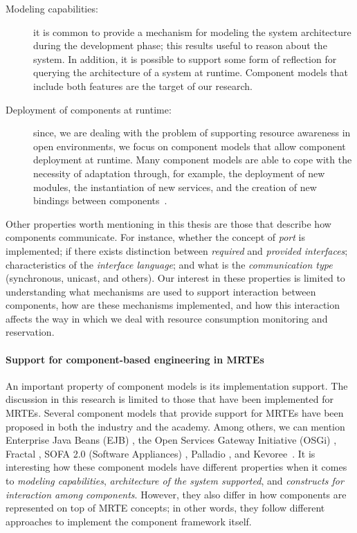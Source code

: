 \begin{description}
\item[Modeling capabilities:] it is common to provide a mechanism for modeling the system architecture during the development phase; this results useful to reason about the system.
In addition, it is possible to support some form of reflection for querying the architecture of a system at runtime.
Component models that include both features are the target of our research.

\item[Deployment of components at runtime:] since, we are dealing with the problem of supporting resource awareness in open environments, we focus on component models that allow component deployment at runtime.
Many component models are able to cope with the necessity of adaptation through, for example, the deployment of new modules, the instantiation of new services, and the creation of new bindings between components~\cite{Porter:2014:RMC:2602458.2602471, Zheng:2014:RCC:2679601.2680405, Irmert:2008:RAS:1370018.1370036, Ghezzi:2010:QDD:2163764.2163774}.
\end{description}

Other properties worth mentioning in this thesis are those that describe how components communicate.
For instance,  whether the concept of \textit{port} is implemented; if there exists distinction between \textit{required} and \textit{provided interfaces}; characteristics of the \textit{interface language}; and what is the \textit{communication type} (synchronous, unicast, and others).
Our interest in these properties is limited to understanding what mechanisms are used to support interaction between components, how are these mechanisms implemented, and how this interaction affects the way in which we deal with resource consumption monitoring and reservation.

\paragraph{Support for component-based engineering in MRTEs}
An important property of component models is its implementation support.
The discussion in this research is limited to those that have been implemented for MRTEs.
Several component models that provide support for MRTEs have been proposed in both the industry and the academy.
Among others, we can mention Enterprise Java Beans (EJB) \cite{OracleEJB3.0}, the Open Services Gateway Initiative (OSGi) \cite{OSGI:r5}, 
Fractal \cite{Bruneton:2006:FCM:1152333.1152345}, 
SOFA 2.0 (Software Appliances) \cite{Bures2006}, Palladio \cite{Becker:2010:PCM:1712605.1712651}, and Kevoree~\cite{morin09a,leger2010reliable}.
It is interesting how these component models have different properties when it comes to \textit{modeling capabilities}, \textit{architecture of the system supported}, and \textit{constructs for interaction among components}.
However, they also differ in how components are represented on top of MRTE concepts; in other words, they follow different approaches to implement the component framework itself.

